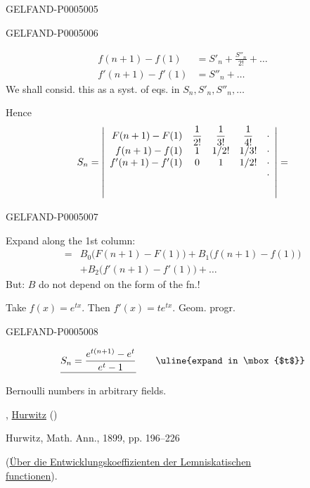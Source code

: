 \begin{GelfandAdjacentEvidence}{GELFAND-P000500}{5}

\end{GelfandAdjacentEvidence}
\begin{GelfandAdjacentEvidence}{GELFAND-P000500}{6}

\begin{align*}
f(n+1)-f(1)&=S'_n+\frac{S''_n}{2!}+\ldots\\
f'(n+1)-f'(1)&=S''_n+\ldots
\end{align*}
We shall consid. this as a syst. of eqs. in $S_n,S'_n,S''_n,\ldots$

Hence
\[
S_n=\left|
\begin{array}{rccc@{\quad}c}
F(n+1)-F(1)&\dfrac{1}{2!}&\dfrac{1}{3!}&\dfrac{1}{4!}&\cdot\\
f(n+1)-f(1)&1&1/2!&1/3!&\cdot\\
f'(n+1)-f'(1)&0&1&1/2!&\cdot\\
&&&&\cdot\\[.7em]
&&&&
\end{array}
\right|=
\]
\end{GelfandAdjacentEvidence}
\begin{GelfandAdjacentEvidence}{GELFAND-P000500}{7}


Expand along the 1st column:
\[
\begin{aligned}
={}&B_0\bigl(F(n+1)-F(1)\bigr)+B_1\bigl(f(n+1)-f(1)\bigr)\\
&+B_2\bigl(f'(n+1)-f'(1)\bigr)+\ldots
\end{aligned}
\]
But: $B$ do not depend on the form of the fn.!

Take $f(x)=e^{tx}$. Then $f'(x)=te^{tx}$. \quad Geom. progr.

\end{GelfandAdjacentEvidence}
\begin{GelfandAdjacentEvidence}{GELFAND-P000500}{8}

\[
\underline{S_n=\frac{e^{t(n+1)}-e^t}{e^t-1}}
\qquad \text{\uline{expand in \mbox{$t$}}}
\]

Bernoulli numbers in arbitrary fields.

,  \uline{Hurwitz}
()

Hurwitz, Math. Ann., 1899, pp. 196--226

(\uline{Über die Entwicklungskoeffizienten der Lemniskatischen}\\
\hspace*{1em}\uline{functionen}).
\end{GelfandAdjacentEvidence}



